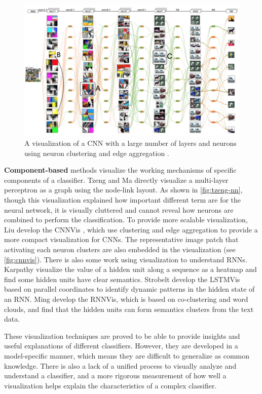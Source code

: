 \begin{figure}
    \centering
    \includegraphics[width=1.0\textwidth]{figure/cnnvis}
    \caption{A visualization of a CNN with a large number of layers and neurons using neuron clustering and edge aggregation \cite{liu2017cnnvis}.}
    \label{fig:cnnvis}
\end{figure}

\textbf{Component-based} methods visualize the working mechanisms of specific components of a classifier. Tzeng and Ma directly visualize a multi-layer perceptron as a graph using the node-link layout. As shown in \autoref{fig:tzeng-nn}, though this visualization explained how important different term are for the neural network, it is visually cluttered and cannot reveal how neurons are combined to perform the classification. To provide more scalable visualization, Liu \etal develop the CNNVis \cite{liu2017cnnvis}, which use clustering and edge aggregation to provide a more compact visualization for CNNs. The representative image patch that activating each neuron clusters are also embedded in the visualization (see \autoref{fig:cnnvis}). There is also some work using visualization to understand RNNs. Karpathy \etal \cite{karpathy16rnn} visualize the value of a hidden unit along a sequence as a heatmap and find some hidden units have clear semantics. Strobelt \etal \cite{strobelt2017lstmvis} develop the LSTMVis based on parallel coordinates to identify dynamic patterns in the hidden state of an RNN. Ming \etal \cite{ming2017vast} develop the RNNVis, which is based on co-clustering and word clouds, and find that the hidden units can form semantics clusters from the text data.

These visualization techniques are proved to be able to provide insights and useful explanations of different classifiers. However, they are developed in a model-specific manner, which means they are difficult to generalize as common knowledge. There is also a lack of a unified process to visually analyze and understand a classifier, and a more rigorous measurement of how well a visualization helps explain the characteristics of a complex classifier.

